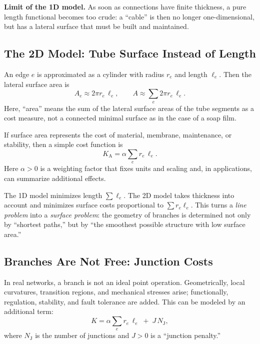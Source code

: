 \medskip
\noindent
\textbf{Limit of the 1D model.}
As soon as connections have finite thickness, a pure length functional becomes too crude:
a ``cable'' is then no longer one-dimensional, but has a lateral surface that must be built and maintained.

\subsection{The 2D Model: Tube Surface Instead of Length}

An edge $e$ is approximated as a cylinder with radius $r_e$ and length $\ell_e$.
Then the lateral surface area is
\begin{equation}
	A_e \approx 2\pi r_e\, \ell_e,
	\qquad
	A \approx \sum_e 2\pi r_e\, \ell_e.
	\label{eq:area_sum}
\end{equation}
Here, ``area'' means the sum of the lateral surface areas of the tube segments as a cost measure,
not a connected minimal surface as in the case of a soap film.

If surface area represents the cost of material, membrane, maintenance, or stability, then a simple cost function is
\begin{equation}
	K_{\text{A}} = \alpha \sum_e r_e\, \ell_e.
	\label{eq:cost_area}
\end{equation}
Here $\alpha>0$ is a weighting factor that fixes units and scaling and, in applications,
can summarize additional effects.
\begin{MathBox}
	\label{box:wire-tube}
	
	The 1D model minimizes length $\sum \ell_e$.
	The 2D model takes thickness into account and minimizes surface costs proportional to
	$\sum r_e\ell_e$.
	This turns a \emph{line problem} into a \emph{surface problem}:
	the geometry of branches is determined not only by ``shortest paths,''
	but by ``the smoothest possible structure with low surface area.''
\end{MathBox}

\subsection{Branches Are Not Free: Junction Costs}

In real networks, a branch is not an ideal point operation.
Geometrically, local curvatures, transition regions, and mechanical stresses arise;
functionally, regulation, stability, and fault tolerance are added.
This can be modeled by an additional term:
\begin{equation}
	K = \alpha \sum_e r_e\,\ell_e \;+\; J\,N_{\text{J}},
	\label{eq:cost_with_junctions}
\end{equation}
where $N_{\text{J}}$ is the number of junctions and $J>0$ is a ``junction penalty.''

